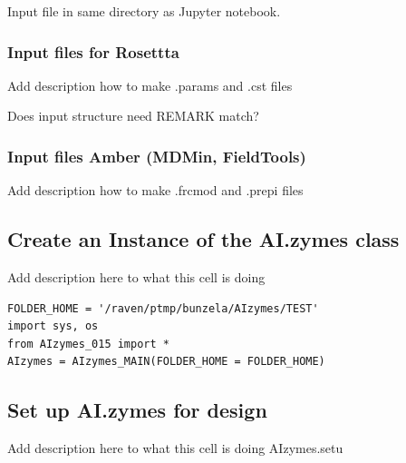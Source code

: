 \documentclass[10pt]{extarticle}
\begin{document}
Input file in same directory as Jupyter notebook. 

\subsubsection{Input files for Rosettta}

Add description how to make .params and .cst files

Does input structure need REMARK match?

\subsubsection{Input files Amber (MDMin, FieldTools)}

Add description how to make .frcmod and .prepi files

\subsection{Create an Instance of the AI.zymes class}

Add description here to what this cell is doing

\vspace*{0.5\baselineskip}
\begin{lstlisting}[basicstyle=\color{black}\fontsize{9}{11}\selectfont\ttfamily, frame=single, rulecolor=\color{black}, breaklines=true]
FOLDER_HOME = '/raven/ptmp/bunzela/AIzymes/TEST'
import sys, os
from AIzymes_015 import *
AIzymes = AIzymes_MAIN(FOLDER_HOME = FOLDER_HOME)
\end{lstlisting}
\vspace*{0.5\baselineskip}

\subsection{Set up AI.zymes for design}

Add description here to what this cell is doing AIzymes.setu
\end{document}
